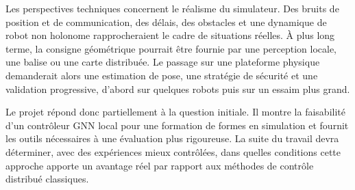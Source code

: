 Les perspectives techniques concernent le réalisme du simulateur. Des bruits de position et de communication, des délais, des obstacles et une dynamique de robot non holonome rapprocheraient le cadre de situations réelles. À plus long terme, la consigne géométrique pourrait être fournie par une perception locale, une balise ou une carte distribuée. Le passage sur une plateforme physique demanderait alors une estimation de pose, une stratégie de sécurité et une validation progressive, d'abord sur quelques robots puis sur un essaim plus grand.

Le projet répond donc partiellement à la question initiale. Il montre la faisabilité d'un contrôleur GNN local pour une formation de formes en simulation et fournit les outils nécessaires à une évaluation plus rigoureuse. La suite du travail devra déterminer, avec des expériences mieux contrôlées, dans quelles conditions cette approche apporte un avantage réel par rapport aux méthodes de contrôle distribué classiques.
